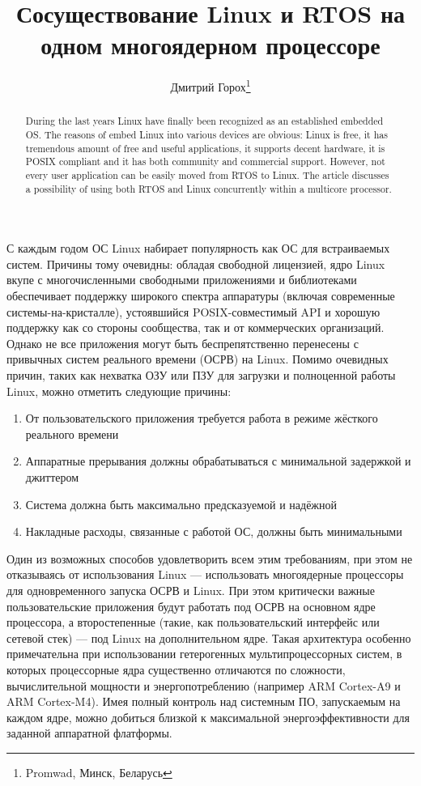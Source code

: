 \documentclass[10pt, a5paper]{article}
\begin{document}
\title{Сосуществование Linux и RTOS на одном многоядерном процессоре}%

\author{Дмитрий Горох\footnote{Promwad, Минск, Беларусь}}
\maketitle

\begin{abstract}
During the last years Linux have finally been recognized as an established embedded OS. The reasons of embed Linux into various devices are obvious: Linux is free, it has tremendous amount of free and useful applications, it supports decent hardware, it is POSIX compliant and it has both community and commercial support. However, not every user application can be easily moved from RTOS to Linux. The article discusses a possibility of using both RTOS and Linux concurrently within a multicore processor.
\end{abstract}


С каждым годом ОС Linux набирает популярность как ОС для встраиваемых систем. Причины тому очевидны: обладая свободной лицензией, ядро Linux вкупе с многочисленными свободными приложениями и библиотеками обеспечивает поддержку широкого спектра аппаратуры (включая современные системы-на-кристалле), устоявшийся POSIX-совместимый API и хорошую поддержку как со стороны сообщества, так и от коммерческих организаций. Однако не все приложения могут быть беспрепятственно перенесены с привычных систем реального времени (ОСРВ) на Linux. Помимо очевидных причин, таких как нехватка ОЗУ или ПЗУ для загрузки и полноценной работы Linux, можно отметить следующие причины:

\begin{enumerate}
  \item От пользовательского приложения требуется работа в режиме жёсткого реального времени
  \item Аппаратные прерывания должны обрабатываться с минимальной задержкой и джиттером
  \item Система должна быть максимально предсказуемой и надёжной
  \item Накладные расходы, связанные с работой ОС, должны быть минимальными
\end{enumerate}

Один из возможных способов удовлетворить всем этим требованиям, при этом не отказываясь от использования Linux --- использовать многоядерные процессоры для одновременного запуска ОСРВ и Linux. При этом критически важные пользовательские приложения будут работать под ОСРВ на основном ядре процессора, а второстепенные (такие, как пользовательский интерфейс или сетевой стек) --- под Linux на дополнительном ядре. Такая архитектура особенно примечательна при использовании гетерогенных мультипроцессорных систем, в которых процессорные ядра существенно отличаются по сложности, вычислительной мощности и энергопотреблению (например ARM Cortex-A9 и ARM Cortex-M4). Имея полный контроль над системным ПО, запускаемым на каждом ядре, можно добиться близкой к максимальной энергоэффективности для заданной аппаратной флатформы.
\end{document}
